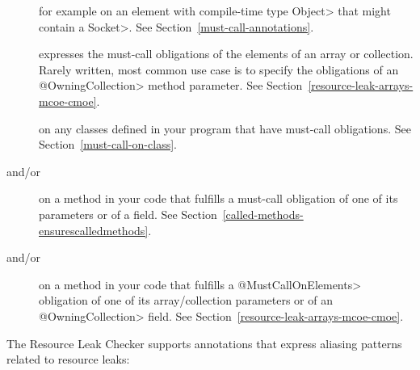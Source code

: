 \begin{description}

\item[]
for example on an element with compile-time type \<Object> that might contain a \<Socket>.
See Section~\ref{must-call-annotations}.

\item[]
expresses the must-call obligations of the elements of an array or collection. Rarely written, most common use case is to specify the obligations of an \<@OwningCollection> method parameter. See Section~\ref{resource-leak-arrays-mcoe-cmoe}.

\item[]
on any classes defined in your program that have must-call obligations. See Section~\ref{must-call-on-class}.

\item[ and/or
      ]
on a method in your code that fulfills a must-call obligation of one of its parameters or of a field.
See Section~\ref{called-methods-ensurescalledmethods}.

\item[ and/or
      ]
on a method in your code that fulfills a \<@MustCallOnElements> obligation of one of its array/collection parameters or of an \<@OwningCollection> field. See Section~\ref{resource-leak-arrays-mcoe-cmoe}.

\end{description}

The Resource Leak Checker supports annotations that express
aliasing patterns related to resource leaks:

